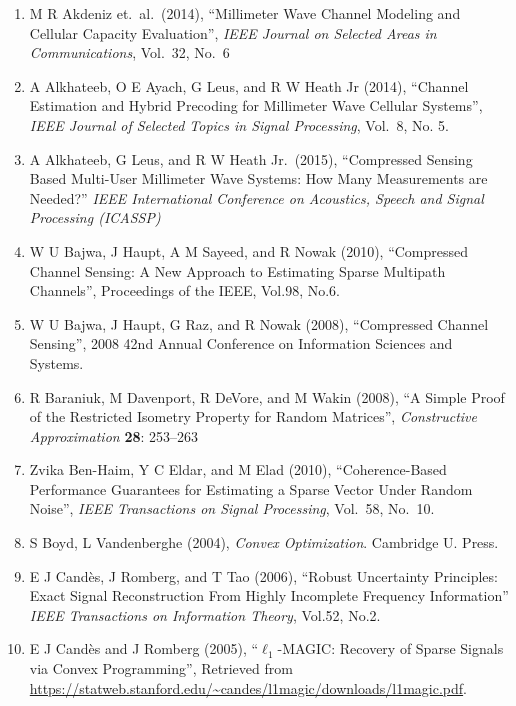 \documentclass[12pt]{article}
\begin{document}
\begin{enumerate}

\item M R Akdeniz et.\ al.\ (2014), ``Millimeter Wave Channel Modeling and Cellular Capacity Evaluation'', \textit{IEEE Journal on Selected Areas in Communications}, Vol.\ 32, No.\ 6

\item A Alkhateeb, O E Ayach, G Leus, and R W Heath Jr (2014), ``Channel Estimation and Hybrid Precoding for Millimeter Wave Cellular Systems'', \textit{IEEE Journal of Selected Topics in Signal Processing}, Vol.\ 8, No. 5.

\item A Alkhateeb, G Leus, and R W Heath Jr.\ (2015), ``Compressed Sensing Based Multi-User Millimeter Wave Systems: How Many Measurements are Needed?'' \textit{IEEE International Conference on Acoustics, Speech and Signal Processing (ICASSP)}

\item W U Bajwa, J Haupt, A M Sayeed, and R Nowak (2010), ``Compressed Channel Sensing: A New Approach to Estimating Sparse Multipath Channels'', Proceedings of the IEEE, Vol.98, No.6.

\item W U Bajwa, J Haupt, G Raz, and R Nowak (2008), ``Compressed Channel Sensing'', 2008 42nd Annual Conference on Information Sciences and Systems.

\item R Baraniuk, M Davenport, R DeVore, and M Wakin (2008), ``A Simple Proof of the Restricted Isometry Property for Random Matrices'', \textit{Constructive Approximation} \textbf{28}: 253–263

\item Zvika Ben-Haim, Y C Eldar, and M Elad (2010), ``Coherence-Based Performance Guarantees for Estimating a Sparse Vector Under Random Noise'', \textit{IEEE Transactions on Signal Processing}, Vol.\ 58, No.\ 10.

\item S Boyd, L Vandenberghe (2004), \textit{Convex Optimization}. Cambridge U. Press.

\item E J Cand\`es, J Romberg, and T Tao (2006), ``Robust Uncertainty Principles: Exact Signal Reconstruction From Highly Incomplete Frequency Information'' \textit{IEEE Transactions on Information Theory}, Vol.52, No.2.

\item E J Cand\`es and J Romberg (2005), ``\(\ell_1\)-MAGIC: Recovery of Sparse Signals via Convex Programming'', Retrieved from \url{https://statweb.stanford.edu/~candes/l1magic/downloads/l1magic.pdf}.


\end{enumerate}
\end{document}
